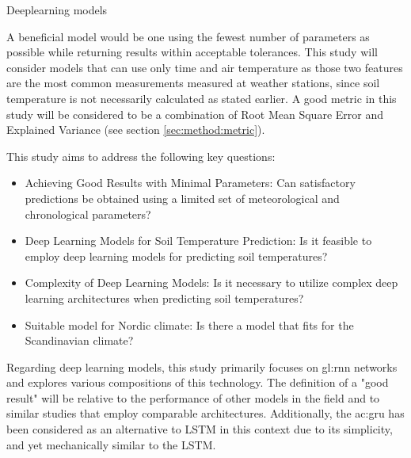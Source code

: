 Deeplearning models

A beneficial model would be one using the fewest number of parameters as possible while returning results within acceptable tolerances. This study will consider models that can use only time and air temperature as those two features are the most common measurements measured at weather stations, since soil temperature is not necessarily calculated as stated earlier. A good metric in this study will be considered to be a combination of Root Mean Square Error and Explained Variance (see section \ref{sec:method:metric}). 

This study aims to address the following key questions:
\begin{itemize}
	\item Achieving Good Results with Minimal Parameters: Can satisfactory predictions be obtained using a limited set of meteorological and chronological parameters?
	
	\item Deep Learning Models for Soil Temperature Prediction: Is it feasible to employ deep learning models for predicting soil temperatures?
	
	\item Complexity of Deep Learning Models: Is it necessary to utilize complex deep learning architectures when predicting soil temperatures?
	
	\item Suitable model for Nordic climate: Is there a model that fits for the Scandinavian climate?
\end{itemize}

Regarding deep learning models, this study primarily focuses on \gls{gl:rnn} networks and explores various compositions of this technology. The definition of a "good result" will be relative to the performance of other models in the field and to similar studies that employ comparable architectures. Additionally, the \acrfull{ac:gru} has been considered as an alternative to LSTM in this context due to its simplicity, and yet mechanically similar to the LSTM.
